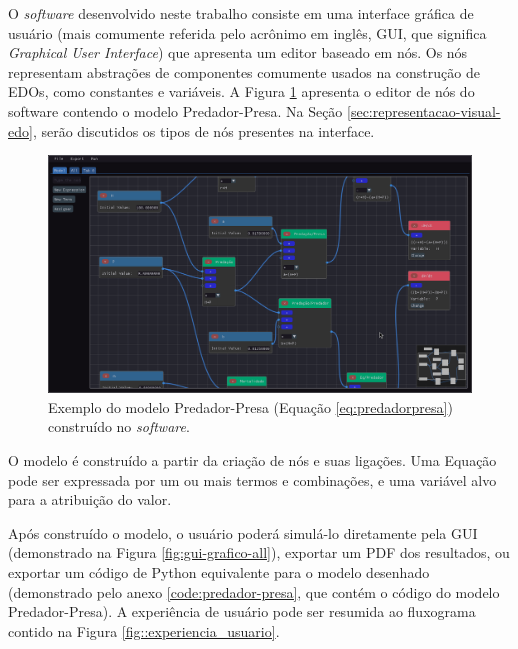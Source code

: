 \documentclass[
	12pt,				%
	openright,			%
	oneside,			%
	a4paper,			%
	main=brazil,
	english,			%
	]{ufsj-abntex2}
\begin{document}
O \textit{software} desenvolvido neste trabalho consiste em uma interface gráfica de usuário (mais comumente referida pelo acrônimo em inglês, GUI, que significa \textit{Graphical User Interface}) que apresenta um editor baseado em nós. Os nós representam abstrações de componentes comumente usados na construção de EDOs, como constantes e variáveis. A Figura \ref{fig:gui-predador-presa} apresenta o editor de nós do software contendo o modelo Predador-Presa. Na Seção \ref{sec:representacao-visual-edo}, serão discutidos os tipos de nós presentes na interface.

\begin{figure}[h]
    \centering
    \includegraphics[width=\textwidth]{imgs/ode-designer/predador-presa.png} 
    \caption{Exemplo do modelo Predador-Presa (Equação \ref{eq:predadorpresa}) construído no \textit{software}.}
    \label{fig:gui-predador-presa}
\end{figure}

O modelo é construído a partir da criação de nós e suas ligações. Uma Equação pode ser expressada por um ou mais termos e combinações, e uma variável alvo para a atribuição do valor.

Após construído o modelo, o usuário poderá simulá-lo diretamente pela GUI (demonstrado na Figura \ref{fig:gui-grafico-all}), exportar um PDF dos resultados, ou exportar um código de Python equivalente para o modelo desenhado (demonstrado pelo anexo \ref{code:predador-presa}, que contém o código do modelo Predador-Presa). A experiência de usuário pode ser resumida ao fluxograma contido na Figura \ref{fig::experiencia_usuario}.
\end{document}
